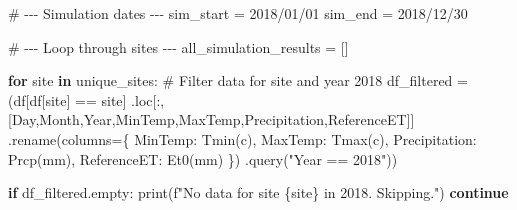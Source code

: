 \documentclass[
  letterpaper,
  DIV=11,
  numbers=noendperiod]{scrartcl}
\newenvironment{Shaded}{\begin{snugshade}}{\end{snugshade}}
\newcommand{\BuiltInTok}[1]{\textcolor[rgb]{0.00,0.23,0.31}{#1}}
\newcommand{\CommentTok}[1]{\textcolor[rgb]{0.37,0.37,0.37}{#1}}
\newcommand{\ControlFlowTok}[1]{\textcolor[rgb]{0.00,0.23,0.31}{\textbf{#1}}}
\newcommand{\KeywordTok}[1]{\textcolor[rgb]{0.00,0.23,0.31}{\textbf{#1}}}
\newcommand{\NormalTok}[1]{\textcolor[rgb]{0.00,0.23,0.31}{#1}}
\newcommand{\OperatorTok}[1]{\textcolor[rgb]{0.37,0.37,0.37}{#1}}
\newcommand{\SpecialCharTok}[1]{\textcolor[rgb]{0.37,0.37,0.37}{#1}}
\newcommand{\SpecialStringTok}[1]{\textcolor[rgb]{0.13,0.47,0.30}{#1}}
\newcommand{\StringTok}[1]{\textcolor[rgb]{0.13,0.47,0.30}{#1}}
\begin{document}
\begin{Shaded}
\begin{Highlighting}[]
\CommentTok{\# {-}{-}{-} Simulation dates {-}{-}{-}}
\NormalTok{sim\_start }\OperatorTok{=} \StringTok{\textquotesingle{}2018/01/01\textquotesingle{}}
\NormalTok{sim\_end }\OperatorTok{=} \StringTok{\textquotesingle{}2018/12/30\textquotesingle{}}

\CommentTok{\# {-}{-}{-} Loop through sites {-}{-}{-}}
\NormalTok{all\_simulation\_results }\OperatorTok{=}\NormalTok{ []}

\ControlFlowTok{for}\NormalTok{ site }\KeywordTok{in}\NormalTok{ unique\_sites:}
    \CommentTok{\# Filter data for site and year 2018}
\NormalTok{    df\_filtered }\OperatorTok{=}\NormalTok{ (df[df[}\StringTok{\textquotesingle{}site\textquotesingle{}}\NormalTok{] }\OperatorTok{==}\NormalTok{ site]}
\NormalTok{                   .loc[:, [}\StringTok{\textquotesingle{}Day\textquotesingle{}}\NormalTok{,}\StringTok{\textquotesingle{}Month\textquotesingle{}}\NormalTok{,}\StringTok{\textquotesingle{}Year\textquotesingle{}}\NormalTok{,}\StringTok{\textquotesingle{}MinTemp\textquotesingle{}}\NormalTok{,}\StringTok{\textquotesingle{}MaxTemp\textquotesingle{}}\NormalTok{,}\StringTok{\textquotesingle{}Precipitation\textquotesingle{}}\NormalTok{,}\StringTok{\textquotesingle{}ReferenceET\textquotesingle{}}\NormalTok{]]}
\NormalTok{                   .rename(columns}\OperatorTok{=}\NormalTok{\{}
                       \StringTok{\textquotesingle{}MinTemp\textquotesingle{}}\NormalTok{: }\StringTok{\textquotesingle{}Tmin(c)\textquotesingle{}}\NormalTok{,}
                       \StringTok{\textquotesingle{}MaxTemp\textquotesingle{}}\NormalTok{: }\StringTok{\textquotesingle{}Tmax(c)\textquotesingle{}}\NormalTok{,}
                       \StringTok{\textquotesingle{}Precipitation\textquotesingle{}}\NormalTok{: }\StringTok{\textquotesingle{}Prcp(mm)\textquotesingle{}}\NormalTok{,}
                       \StringTok{\textquotesingle{}ReferenceET\textquotesingle{}}\NormalTok{: }\StringTok{\textquotesingle{}Et0(mm)\textquotesingle{}}
\NormalTok{                   \})}
\NormalTok{                   .query(}\StringTok{"Year == 2018"}\NormalTok{))}
    
    \ControlFlowTok{if}\NormalTok{ df\_filtered.empty:}
        \BuiltInTok{print}\NormalTok{(}\SpecialStringTok{f"No data for site }\SpecialCharTok{\{}\NormalTok{site}\SpecialCharTok{\}}\SpecialStringTok{ in 2018. Skipping."}\NormalTok{)}
        \ControlFlowTok{continue}


\end{Highlighting}
\end{Shaded}
\end{document}
